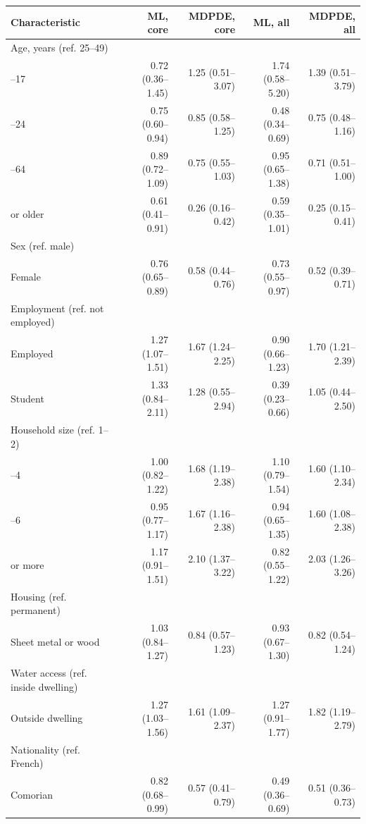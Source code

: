 \begin{tabular}{lrrrr}
\toprule
Characteristic & ML, core & MDPDE, core & ML, all & MDPDE, all \\
\midrule
Age, years (ref. 25--49) &  &  &  &  \\
\quad 15--17 & 0.72 (0.36--1.45) & 1.25 (0.51--3.07) & 1.74 (0.58--5.20) & 1.39 (0.51--3.79) \\
\quad 18--24 & 0.75 (0.60--0.94) & 0.85 (0.58--1.25) & 0.48 (0.34--0.69) & 0.75 (0.48--1.16) \\
\quad 50--64 & 0.89 (0.72--1.09) & 0.75 (0.55--1.03) & 0.95 (0.65--1.38) & 0.71 (0.51--1.00) \\
\quad 65 or older & 0.61 (0.41--0.91) & 0.26 (0.16--0.42) & 0.59 (0.35--1.01) & 0.25 (0.15--0.41) \\
\addlinespace
Sex (ref. male) &  &  &  &  \\
\quad Female & 0.76 (0.65--0.89) & 0.58 (0.44--0.76) & 0.73 (0.55--0.97) & 0.52 (0.39--0.71) \\
\addlinespace
Employment (ref. not employed) &  &  &  &  \\
\quad Employed & 1.27 (1.07--1.51) & 1.67 (1.24--2.25) & 0.90 (0.66--1.23) & 1.70 (1.21--2.39) \\
\quad Student & 1.33 (0.84--2.11) & 1.28 (0.55--2.94) & 0.39 (0.23--0.66) & 1.05 (0.44--2.50) \\
\addlinespace
Household size (ref. 1--2) &  &  &  &  \\
\quad 3--4 & 1.00 (0.82--1.22) & 1.68 (1.19--2.38) & 1.10 (0.79--1.54) & 1.60 (1.10--2.34) \\
\quad 5--6 & 0.95 (0.77--1.17) & 1.67 (1.16--2.38) & 0.94 (0.65--1.35) & 1.60 (1.08--2.38) \\
\quad 7 or more & 1.17 (0.91--1.51) & 2.10 (1.37--3.22) & 0.82 (0.55--1.22) & 2.03 (1.26--3.26) \\
\addlinespace
Housing (ref. permanent) &  &  &  &  \\
\quad Sheet metal or wood & 1.03 (0.84--1.27) & 0.84 (0.57--1.23) & 0.93 (0.67--1.30) & 0.82 (0.54--1.24) \\
\addlinespace
Water access (ref. inside dwelling) &  &  &  &  \\
\quad Outside dwelling & 1.27 (1.03--1.56) & 1.61 (1.09--2.37) & 1.27 (0.91--1.77) & 1.82 (1.19--2.79) \\
\addlinespace
Nationality (ref. French) &  &  &  &  \\
\quad Comorian & 0.82 (0.68--0.99) & 0.57 (0.41--0.79) & 0.49 (0.36--0.69) & 0.51 (0.36--0.73) \\

\end{tabular}
